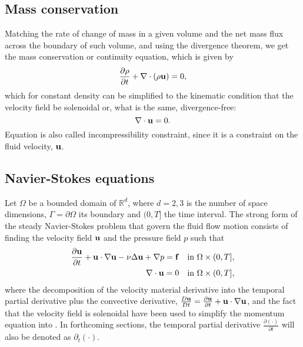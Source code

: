 \subsection{Mass conservation}
\label{subsec-mass_conservation}
Matching the rate of change of mass in a given volume and the net mass flux across the boundary of such volume, and using the divergence theorem, we get the mass conservation or continuity equation, which is given by 
\begin{equation}
\label{eq-continuity_equation_def1}
\frac{\partial\rho}{\partial t}+\nabla\cdot(\rho{\bf u})=0,
\end{equation}
which for constant density can be simplified to the kinematic condition that the velocity field be solenoidal or, what is the same, divergence-free:
\begin{equation}
\label{eq-continuity_equation_def2}
\nabla\cdot{\bf u}=0.
\end{equation}
Equation  is also called incompressibility constraint, since it is a constraint on the fluid velocity, ${\bf u}$.

\subsection{Navier-Stokes equations}
\label{subsec-NS_equations}
Let $\Omega$ be a bounded domain of $\mathbb{R}^d$, where $d=2,3$ is the number of space dimensions, $\Gamma=\partial\Omega$ its boundary and $(0,T]$ the time interval. The strong form of the steady Navier-Stokes problem that govern the fluid flow motion consists of finding the velocity field ${\bf u}$ and the pressure field $p$ such that 
\begin{align}
\label{eq-NS_strong_momentum}
\frac{\partial{\bf u}}{\partial t}+{\bf u}\cdot\nabla{\bf u}-\nu\Delta{\bf u}+\nabla p={\bf f}&\quad\mbox{in }\Omega\times(0,T],\\
\label{eq-NS_strong_continuity}
\nabla\cdot{\bf u}=0&\quad\mbox{in }\Omega\times(0,T],
\end{align}
where the decomposition of the velocity material derivative into the temporal partial derivative plus the convective derivative, $\frac{D{\bf u}}{Dt}=\frac{\partial{\bf u}}{\partial t}+{\bf u}\cdot\nabla{\bf u}$, and the fact that the velocity field is solenoidal have been used to simplify the momentum equation  into . In forthcoming sections, the temporal partial derivative $ \frac{\partial(\cdot)}{\partial t} $ will also be denoted as $ \partial_t(\cdot) $.


